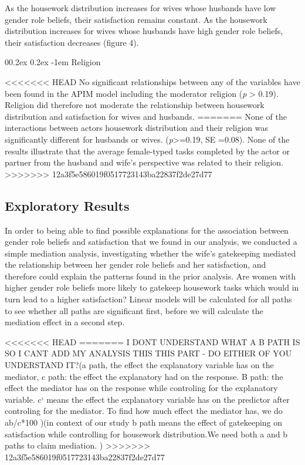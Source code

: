 \documentclass[
  man,floatsintext]{apa6}
\makeatletter
\let\oldparagraph\paragraph
\renewcommand{\paragraph}[1]{\oldparagraph{#1}\mbox{}}
\renewcommand{\paragraph}{\@startsection{paragraph}{4}{\parindent}%
  {0\baselineskip \@plus 0.2ex \@minus 0.2ex}%
  {-1em}%
  {\normalfont\normalsize\bfseries\itshape\typesectitle}}
\makeatother
\begin{document}
As the housework distribution increases for wives whose husbands have low gender role beliefs, their satisfaction remains constant. As the housework distribution increases for wives whose husbands have high gender role beliefs, their satisfaction decreases (figure 4).

\hypertarget{religion}{%
\paragraph{Religion}\label{religion}}

<<<<<<< HEAD
No significant relationships between any of the variables have been found in the APIM model including the moderator religion (\emph{p} \textgreater{} 0.19). Religion did therefore not moderate the relationship between housework distribution and satisfaction for wives and husbands.
=======
None of the interactions between actors housework distribution and their religion was significantly different for husbands or wives. (\emph{p}\textgreater=0.19, SE =0.08). None of the results illustrate that the average female-typed tasks completed by the actor or partner from the husband and wife's perspective was related to their religion.
>>>>>>> 12a3f5e586019f0517723143ba22837f2de27d77

\hypertarget{exploratory-results}{%
\subsection{Exploratory Results}\label{exploratory-results}}

In order to being able to find possible explanations for the association between gender role beliefs and satisfaction that we found in our analysis, we conducted a simple mediation analysis, investigating whether the wife's gatekeeping mediated the relationship between her gender role beliefs and her satisfaction, and therefore could explain the patterns found in the prior analysis. Are women with higher gender role beliefs more likely to gatekeep housework tasks which would in turn lead to a higher satisfaction?
Linear models will be calculated for all paths to see whether all paths are significant first, before we will calculate the mediation effect in a second step.



<<<<<<< HEAD
=======
I DONT UNDERSTAND WHAT A B PATH IS SO I CANT ADD MY ANALYSIS THIS THIS PART - DO EITHER OF YOU UNDERSTAND IT?(a path, the effect the explanatory variable has on the mediator, c path: the effect the explanatory had on the response. B path: the effect the mediator has on the response while controling for the explanatory variable. c` means the effect the explanatory variable has on the predictor after controling for the mediator. To find how much effect the mediator has, we do ab/c*100 )(in context of our study b path means the effect of gatekeeping on satisfaction while controlling for housework distribution.We need both a and b paths to claim mediation. )
>>>>>>> 12a3f5e586019f0517723143ba22837f2de27d77
\end{document}
